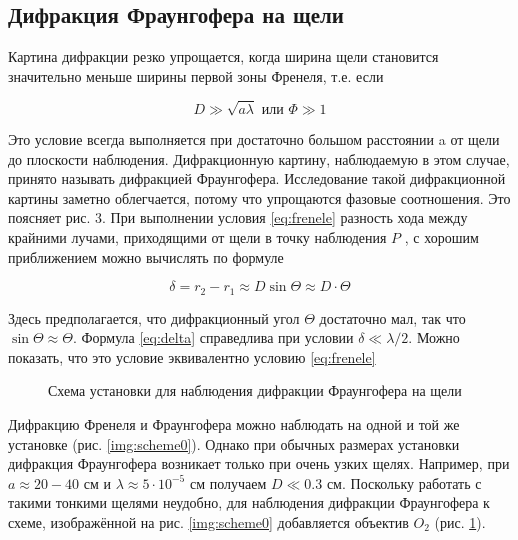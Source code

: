 \documentclass[a5paper,10pt, twoside]{article} %
\begin{document}
\subsection{Дифракция Фраунгофера на щели}

	Картина дифракции резко упрощается, когда ширина щели становится значительно меньше ширины первой
	зоны Френеля, т.е. если

	\begin{equation}\label{eq:frenele}
		D \gg \sqrt{a \lambda} \text{ или } \Phi \gg 1
	\end{equation}

	Это условие всегда выполняется при достаточно большом расстоянии a от щели до плоскости наблюдения.
	Дифракционную картину, наблюдаемую в этом случае, принято называть дифракцией Фраунгофера.
	Исследование такой дифракционной картины заметно облегчается, потому что упрощаются фазовые
	соотношения. Это поясняет рис. 3. При выполнении условия \eqref{eq:frenele} разность хода между
	крайними лучами, приходящими от щели в точку наблюдения $P$ , с хорошим приближением можно
	вычислять по формуле

	\begin{equation}\label{eq:delta}
		\delta = r_2 - r_1 \approx D \sin \Theta \approx D \cdot \Theta
	\end{equation}

	Здесь предполагается, что дифракционный угол $\Theta$ достаточно мал, так что 
	$\sin \Theta \approx \Theta$. Формула \eqref{eq:delta} справедлива при условии $\delta \ll \lambda / 2$.
	Можно показать, что это условие эквивалентно условию \eqref{eq:frenele}

	\begin{figure}[h]\label{img:scheme1}
		\caption{Схема установки для наблюдения дифракции Фраунгофера на щели}
	\end{figure}


	Дифракцию Френеля и Фраунгофера можно наблюдать на одной и той же установке (рис. \ref{img:scheme0}).
	Однако при обычных размерах установки дифракция Фраунгофера возникает только при очень узких щелях.
	Например, при $a \approx 20-40$ см и $\lambda \approx 5 \cdot 10^{-5}$ см получаем $D \ll 0.3$ см.
	Поскольку работать с такими тонкими щелями неудобно, для наблюдения дифракции Фраунгофера к схеме,
	изображённой на рис. \ref{img:scheme0} добавляется объектив $O_2$ (рис. \ref{img:scheme1}).
\end{document}
